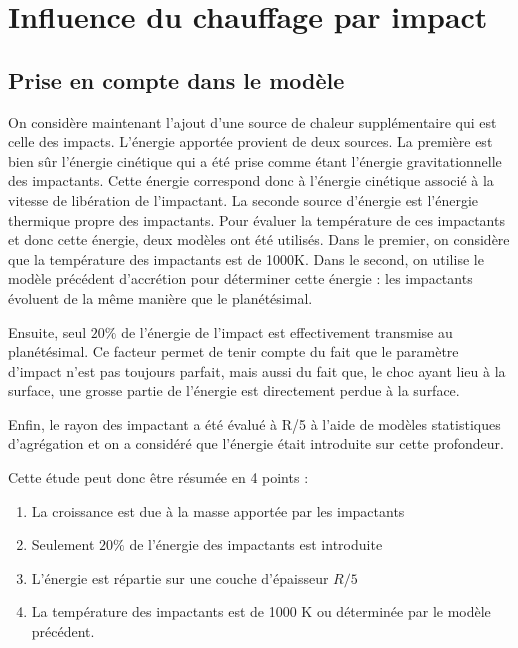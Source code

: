 \documentclass[10pt,a4paper]{article}
\numberwithin{equation}{section}
\begin{document}
\section{Influence du chauffage par impact}

\subsection{Prise en compte dans le modèle}
On considère maintenant l'ajout d'une source de chaleur supplémentaire qui est celle des impacts. L'énergie apportée provient de deux sources. La première est bien sûr l'énergie cinétique qui a été prise comme étant l'énergie gravitationnelle des impactants. Cette énergie correspond donc à l'énergie cinétique associé à la vitesse de libération de l'impactant. La seconde source d'énergie est l'énergie thermique propre des impactants. Pour évaluer la température de ces impactants et donc cette énergie, deux modèles ont été utilisés. Dans le premier, on considère que la température des impactants est de 1000K. Dans le second, on utilise le modèle précédent d'accrétion pour déterminer cette énergie : les impactants évoluent de la même manière que le planétésimal.
\medskip

Ensuite, seul $20\%$ de l'énergie de l'impact est effectivement transmise au planétésimal. Ce facteur permet de tenir compte du fait que le paramètre d'impact n'est pas toujours parfait, mais aussi du fait que, le choc ayant lieu à la surface, une grosse partie de l'énergie est directement perdue à la surface.
\medskip

Enfin, le rayon des impactant a été évalué à R/5 à l'aide de modèles statistiques d'agrégation et on a considéré que l'énergie était introduite sur cette profondeur.

Cette étude peut donc être résumée en 4 points :
\begin{enumerate}
\item La croissance est due à la masse apportée par les impactants
\item Seulement $20\%$ de l'énergie des impactants est introduite
\item L'énergie est répartie sur une couche d'épaisseur $R/5$
\item La température des impactants est de 1000 K ou déterminée par le modèle précédent.
\end{enumerate}
\end{document}

